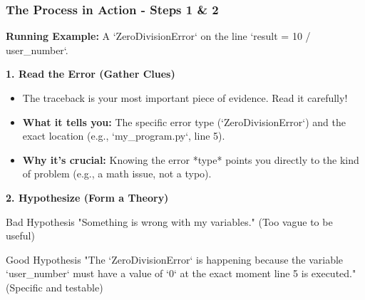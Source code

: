 \documentclass{beamer}
\begin{document}
\begin{frame}[fragile]
    \frametitle{The Process in Action - Steps 1 \& 2}

    \textbf{Running Example:} A `ZeroDivisionError` on the line `result = 10 / user_number`.

    \vspace{1em}
    \textbf{1. Read the Error (Gather Clues)}
    \begin{itemize}
        \item The traceback is your most important piece of evidence. Read it carefully!
        \item \textbf{What it tells you:} The specific error type (`ZeroDivisionError`) and the exact location (e.g., `my_program.py`, line 5).
        \item \textbf{Why it's crucial:} Knowing the error *type* points you directly to the kind of problem (e.g., a math issue, not a typo).
    \end{itemize}
    
    \vspace{1em}
    \textbf{2. Hypothesize (Form a Theory)}
    \begin{alertblock}{Bad Hypothesis}
        "Something is wrong with my variables." (Too vague to be useful)
    \end{alertblock}
    
    \begin{exampleblock}{Good Hypothesis}
        "The `ZeroDivisionError` is happening because the variable `user_number` must have a value of `0` at the exact moment line 5 is executed." (Specific and testable)
    \end{exampleblock}
\end{frame}
\end{document}
